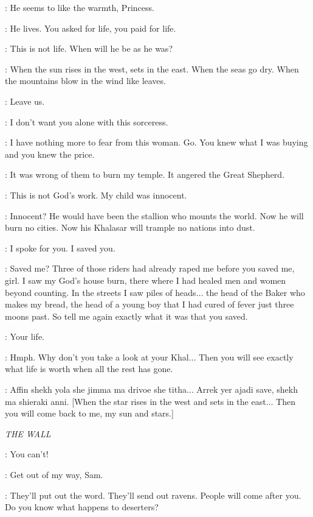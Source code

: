 \JORAH: He seems to like the warmth, Princess. 

\MIRRI: He lives. You asked for life, you paid for life. 

\DAENERYS: This is not life. When will he be as he was? 

\MIRRI: When the sun rises in the west, sets in the east.  When the seas go dry. When the mountains blow in the wind like leaves. 

\DAENERYS:  Leave us. 

\JORAH: I don't want you alone with this sorceress. 

\DAENERYS: I have nothing more to fear from this
woman. Go.  You knew what I was buying and you knew the price. 

\MIRRI: It was wrong of them to burn my temple. It angered the Great Shepherd. 

\DAENERYS: This is not God's work. My child was innocent. 

\MIRRI: Innocent? He would have been the stallion who mounts the world. Now he will burn no cities. Now his Khalasar will trample no nations into dust. 

\DAENERYS: I spoke for you. I saved you. 

\MIRRI: Saved me? Three of those riders had already raped me before you saved me, girl. I saw my God's house burn, there where I had healed men and women beyond counting. In the streets I saw piles of heads$\ldots$ the head of the Baker who makes my bread, the head of a young boy that I had cured of fever just three moons past. So tell me again exactly what it was that you saved. 

\DAENERYS: Your life. 

\MIRRI: Hmph. Why don't you take a look at your Khal$\ldots$ Then you will see exactly what life is worth when all the rest has gone. 

\DAENERYS:  Affin shekh yola she jimma ma drivoe she titha$\ldots$ Arrek yer ajadi save, shekh ma shieraki anni. [When the star rises in the west and sets in the east$\ldots$ Then you will come back to me, my sun and stars.]


\scene

\textit{THE WALL}


\SAM: You can't! 

\JON: Get out of my way, Sam. 

\SAM: They'll put out the word. They'll send out ravens. People will come after you. Do you know what happens to deserters? 

